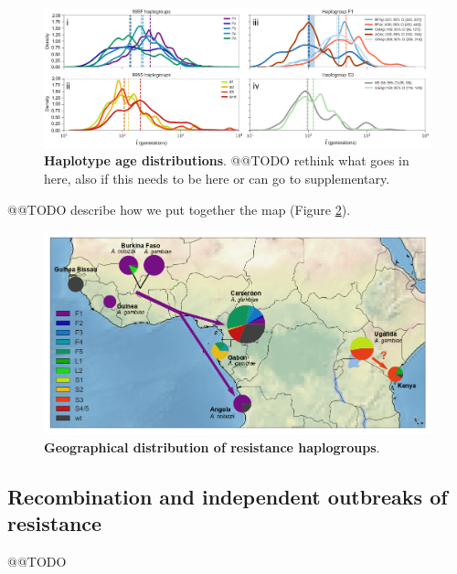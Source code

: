 \documentclass[a4paper,11pt,abstracton]{scrartcl}
\begin{document}
%
\begin{figure}[!b]
  \includegraphics[width=1.1\linewidth,center]{artwork/Figure_3_RelativeAges_tweak_final.png}
  \caption{\textbf{Haplotype age distributions}. @@TODO rethink what goes in here, also if this needs to be here or can go to supplementary.}
  \label{fig:ages}
\end{figure}


%
@@TODO describe how we put together the map (Figure \ref{fig:map}).


%
\begin{figure}[!b]
  \includegraphics[width=1.1\linewidth,center]{artwork/fig_map.png}
  \caption{\textbf{Geographical distribution of resistance haplogroups}. }
  \label{fig:map}
\end{figure}


\subsection*{Recombination and independent outbreaks of resistance}


%
@@TODO
\end{document}
